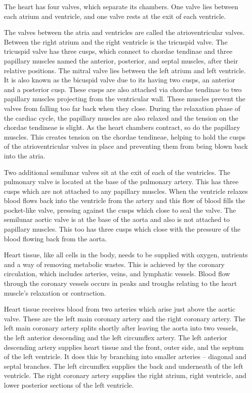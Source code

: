 The heart has four valves, which separate its chambers. One valve lies
between each atrium and ventricle, and one valve rests at the exit of
each ventricle.

The valves between the atria and ventricles are called the
atrioventricular valves. Between the right atrium and the right
ventricle is the tricuspid valve. The tricuspid valve has three cusps,
which connect to chordae tendinae and three papillary muscles named the
anterior, posterior, and septal muscles, after their relative positions.
The mitral valve lies between the left atrium and left ventricle. It is
also known as the bicuspid valve due to its having two cusps, an
anterior and a posterior cusp. These cusps are also attached via chordae
tendinae to two papillary muscles projecting from the ventricular wall.
These muscles prevent the valves from falling too far back when they
close. During the relaxation phase of the cardiac cycle, the papillary
muscles are also relaxed and the tension on the chordae tendineae is
slight. As the heart chambers contract, so do the papillary muscles.
This creates tension on the chordae tendineae, helping to hold the cusps
of the atrioventricular valves in place and preventing them from being
blown back into the atria.

Two additional semilunar valves sit at the exit of each of the
ventricles. The pulmonary valve is located at the base of the pulmonary
artery. This has three cusps which are not attached to any papillary
muscles. When the ventricle relaxes blood flows back into the ventricle
from the artery and this flow of blood fills the pocket-like valve,
pressing against the cusps which close to seal the valve. The semilunar
aortic valve is at the base of the aorta and also is not attached to
papillary muscles. This too has three cusps which close with the
pressure of the blood flowing back from the aorta.

Heart tissue, like all cells in the body, needs to be supplied with
oxygen, nutrients and a way of removing metabolic wastes. This is
achieved by the coronary circulation, which includes arteries, veins,
and lymphatic vessels. Blood flow through the coronary vessels occurs in
peaks and troughs relating to the heart muscle's relaxation or
contraction.

Heart tissue receives blood from two arteries which arise just above the
aortic valve. These are the left main coronary artery and the right
coronary artery. The left main coronary artery splits shortly after
leaving the aorta into two vessels, the left anterior descending and the
left circumflex artery. The left anterior descending artery supplies
heart tissue and the front, outer side, and the septum of the left
ventricle. It does this by branching into smaller arteries -- diagonal
and septal branches. The left circumflex supplies the back and
underneath of the left ventricle. The right coronary artery supplies the
right atrium, right ventricle, and lower posterior sections of the left
ventricle.

